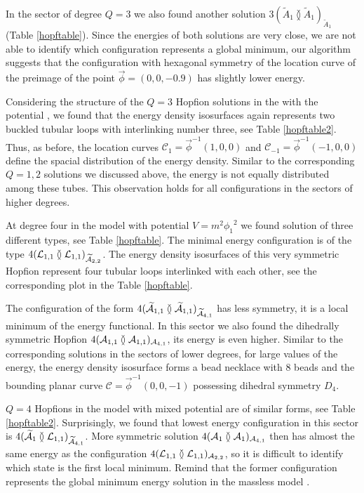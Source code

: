 \documentclass[12pt,a4paper]{article}
\begin{document}
In the sector of degree $Q=3$ we also found another solution $3(\widetilde A_1\between \widetilde A_1)_{\widetilde A_1}$
(Table \ref{hopftable}). Since the energies of both solutions are very close, we are not able
to identify which configuration represents a global minimum, our algorithm suggests that the configuration with
hexagonal symmetry of the location curve of the preimage of the point $\vec \phi=(0, 0, -0.9)$ has slightly lower energy.

Considering the structure of the $Q=3$ Hopfion solutions in the  with the
potential , we found that
the energy density isosurfaces again represents two buckled tubular loops with interlinking number three, see
Table \ref{hopftable2}.
Thus, as before, the location curves $\mathcal{C}_1 = \vec \phi^{-1}(1,0,0)$ and $\mathcal{C}_{-1} = \vec \phi^{-1}(-1,0,0)$
define the spacial distribution of the energy density.
Similar to the corresponding $Q=1,2$ solutions we discussed above, the energy is not equally distributed
among these tubes. This observation holds for all configurations in the sectors of higher degrees.

At degree four in the model  with potential $V=m^2{\phi_1}^2$ we found solution of three different types, see
Table \ref{hopftable}. The minimal energy configuration is of the type
$4(\mathcal{L}_{1,1}\between\mathcal{L}_{1,1})_{\widetilde {\mathcal{A}}_{2,2}}$. The energy density isosurfaces of this very symmetric
Hopfion represent four tubular loops interlinked with each other, see the corresponding plot in the Table \ref{hopftable}.

The configuration of the form $4(\widetilde {\mathcal{A}}_{1,1}\between \widetilde {\mathcal{A}}_{1,1})_{\widetilde {\mathcal{A}}_{4,1}}$ has less symmetry, it is a local minimum
of the energy functional. In this sector we also found  the  dihedrally symmetric Hopfion
$4(\mathcal{A}_{1,1}\between \mathcal{A}_{1,1})_{\mathcal{A}_{4,1}}$, its energy is even higher. Similar to the corresponding solutions in the sectors
of lower degrees, for large values of the energy, the energy density isosurface forms a bead necklace with 8 beads and the bounding
planar curve $\mathcal{C} = \vec \phi^{-1}(0,0,-1)$  possessing dihedral symmetry $D_4$.

$Q=4$ Hopfions in the model   with mixed potential  are of similar forms, see Table \ref{hopftable2}.
Surprisingly, we found that lowest energy configuration in this sector is
$4(\widetilde{\mathcal{A}}_1\between\mathcal{L}_{1,1})_{\widetilde{\mathcal{A}}_{4,1}}$. More symmetric solution $4(\mathcal{A}_1\between\mathcal{A}_1)_{\mathcal{A}_{4,1}}$ then
has almost the same energy as the configuration $4(\mathcal{L}_{1,1}\between\mathcal{L}_{1,1})_{\mathcal{A}_{2,2}}$, so it is difficult to identify which state
is the first local minimum. Remind that the former configuration represents the global minimum energy solution in the massless
model \cite{Sutcliffe:2007ui}.
\end{document}
